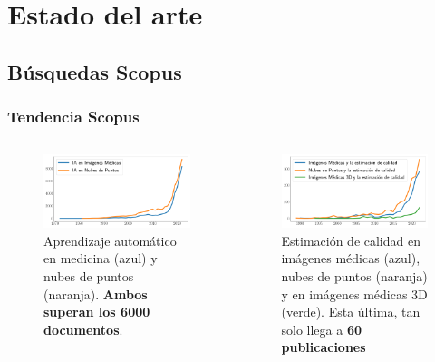 \section{Estado del arte}
\subsection{Búsquedas Scopus}
\begin{frame}
    \frametitle{Tendencia Scopus}
    \begin{columns}
      \begin{figure}
        \begin{center}
          \includegraphics[width=\textwidth]{imagenes/chapter2/ScopusMLinMedicineAndPC}
        \end{center}
        \caption{Aprendizaje automático en medicina (azul) y nubes de puntos (naranja).
        \textbf{Ambos superan los 6000 documentos}.}
      \end{figure}
      
      \begin{figure}
        \begin{center}
          \includegraphics[width=\textwidth]{imagenes/chapter2/ScopusQualityAssessment}
        \end{center}
        \caption{Estimación de calidad en imágenes médicas (azul), nubes de puntos (naranja) 
          y en imágenes médicas 3D (verde). Esta última, tan solo llega a \textbf{60 publicaciones}}
      \end{figure}
    \end{columns}
\end{frame}

